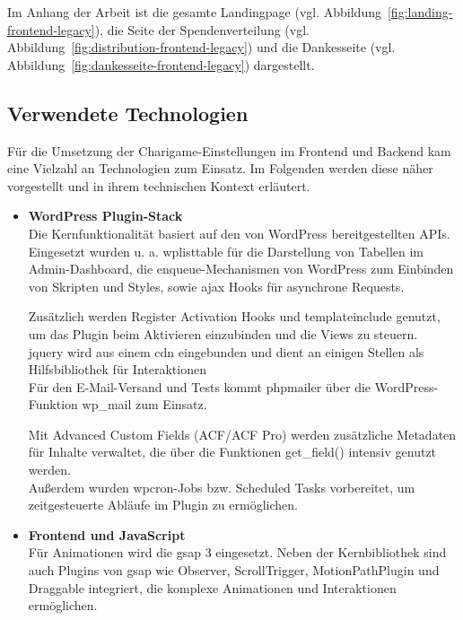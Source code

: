 Im Anhang der Arbeit ist die gesamte Landingpage (vgl. Abbildung~\ref{fig:landing-frontend-legacy}), die Seite der Spendenverteilung (vgl. Abbildung~\ref{fig:distribution-frontend-legacy}) und die Dankesseite (vgl. Abbildung~\ref{fig:dankesseite-frontend-legacy}) dargestellt.

\subsection{Verwendete Technologien}
Für die Umsetzung der Charigame-Einstellungen im Frontend und Backend kam eine Vielzahl an Technologien zum Einsatz.
Im Folgenden werden diese näher vorgestellt und in ihrem technischen Kontext erläutert.

\begin{itemize}
    \item \textbf{WordPress Plugin-Stack}\\
    Die Kernfunktionalität basiert auf den von WordPress bereitgestellten APIs. %
    Eingesetzt wurden u. a. \gls{wplisttable} für die Darstellung von Tabellen im Admin-Dashboard, die \gls{enqueue}-Mechanismen von WordPress zum Einbinden von Skripten und Styles, sowie \gls{ajax} Hooks für asynchrone Requests.

    Zusätzlich werden Register Activation Hooks und \gls{templateinclude} genutzt, um das Plugin beim Aktivieren einzubinden und die Views zu steuern.\\
    \gls{jquery} wird aus einem \gls{cdn} eingebunden und dient an einigen Stellen als Hilfsbibliothek für Interaktionen\\
    Für den E-Mail-Versand und Tests kommt \gls{phpmailer} über die WordPress-Funktion wp\_mail zum Einsatz.

    Mit Advanced Custom Fields (ACF/ACF Pro) werden zusätzliche Metadaten für Inhalte verwaltet, die über die Funktionen get\_field() intensiv genutzt werden.\\
    Außerdem wurden \gls{wpcron}-Jobs bzw. Scheduled Tasks vorbereitet, um zeitgesteuerte Abläufe im Plugin zu ermöglichen.

    \item \textbf{Frontend und JavaScript}\\
    Für Animationen wird die \gls{gsap} 3 eingesetzt.
    Neben der Kernbibliothek sind auch Plugins von \gls{gsap} wie Observer, ScrollTrigger, MotionPathPlugin und Draggable integriert, die komplexe Animationen und Interaktionen ermöglichen.


\end{itemize}
